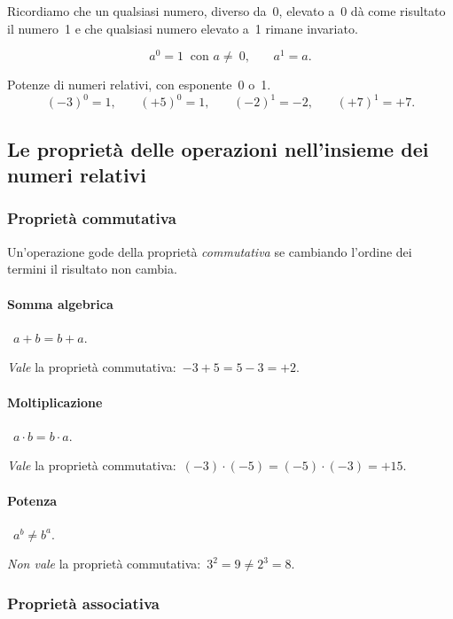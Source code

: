 Ricordiamo che un qualsiasi numero, diverso da~0, elevato a~0 dà come risultato il numero~1 e che qualsiasi
numero elevato a~1 rimane invariato.

\[a^0=1\:\text{ con }a\neq~0\text{,}\qquad a^1=a.\]
 \begin{exrig}
 \begin{esempio}
 Potenze di numeri relativi, con esponente~0 o~1.
\[(-3)^0=1\text{,}\qquad (+5)^0=1\text{,}\qquad (-2)^1=-2\text{,}\qquad (+7)^1=+7.\]
 \end{esempio}

\end{exrig}

\ovalbox{\risolvii \ref{ese:2.22}, \ref{ese:2.23}, \ref{ese:2.24}, \ref{ese:2.25}, \ref{ese:2.26}, \ref{ese:2.27}}

\subsection{Le proprietà delle operazioni nell'insieme dei numeri relativi}
\subsubsection{Proprietà commutativa}

Un'operazione gode della proprietà \emph{commutativa} se cambiando l'ordine dei termini il risultato non cambia.
\paragraph{Somma algebrica}~$a+b=b+a$.

\emph{Vale} la proprietà commutativa:~$-3+5=5-3=+2$.

\paragraph{Moltiplicazione}~$a\cdot b=b\cdot a$.

\emph{Vale} la proprietà commutativa:~$(-3)\cdot(-5)=(-5)\cdot(-3)=+15$.

\paragraph{Potenza}~$a^b\neq b^a$.

\emph{Non vale} la proprietà commutativa:~$3^2=9\neq2^3=8$.


\subsubsection{Proprietà associativa}

